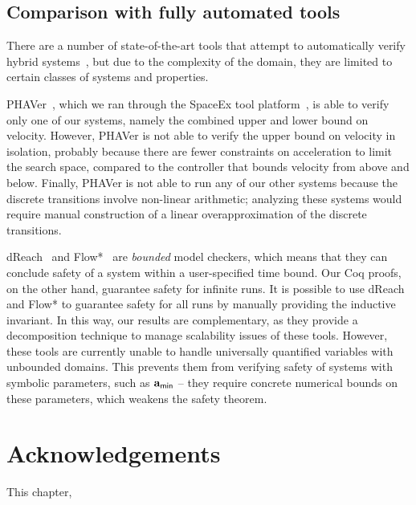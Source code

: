 \subsection{Comparison with fully automated tools}
There are a number of state-of-the-art tools that attempt to automatically
verify hybrid
systems~\cite{PHAVerSTTT08,chen2015flow,kong2015dreach,HyTechCAV97}, but
due to the complexity of the domain, they are limited to certain classes of
systems and properties.

PHAVer~\cite{PHAVerSTTT08}, which we ran through the SpaceEx tool
platform~\cite{frehse2011spaceex-small}, is able to verify only one of our
systems, namely the combined upper and lower bound on velocity.  However,
PHAVer is not able to verify the upper bound on velocity in isolation,
probably because there are fewer constraints on acceleration to limit the
search space, compared to the controller that bounds velocity from above
and below.  Finally, PHAVer is not able to run any of our other systems
because the discrete transitions involve non-linear arithmetic; analyzing
these systems would require manual construction of a linear
overapproximation of the discrete transitions.

dReach~\cite{kong2015dreach} and Flow*~\cite{chen2015flow}
are \emph{bounded} model checkers, which means that they can conclude
safety of a system within a user-specified time bound.  Our Coq proofs, on
the other hand, guarantee safety for infinite runs.  It is possible to use
dReach and Flow* to guarantee safety for all runs by manually providing the
inductive invariant.  In this way, our results are complementary, as they
provide a decomposition technique to manage scalability issues of these
tools.  However, these tools are currently unable to handle universally
quantified variables with unbounded domains.  This prevents them from
verifying safety of systems with symbolic parameters, such as $\mathbf{a}_{\mathsf{min}}$ --
they require concrete numerical bounds on these parameters, which weakens
the safety theorem.

\section{Acknowledgements}
This chapter, \emsoftack{}
